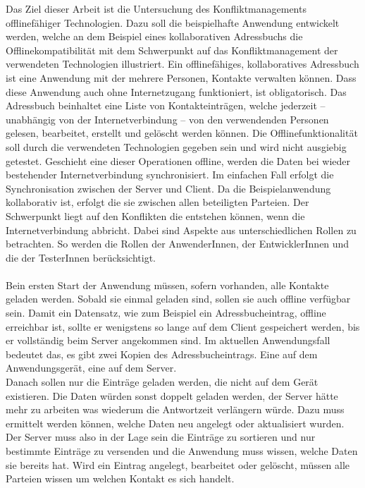 Das Ziel dieser Arbeit ist die Untersuchung des Konfliktmanagements offlinefähiger Technologien.
Dazu soll die beispielhafte Anwendung entwickelt werden, welche an dem Beispiel eines kollaborativen Adressbuchs die Offlinekompatibilität mit dem Schwerpunkt auf das Konfliktmanagement der verwendeten Technologien illustriert.
Ein offlinefähiges, kollaboratives Adressbuch ist eine Anwendung mit der mehrere Personen, Kontakte verwalten können.
Dass diese Anwendung auch ohne Internetzugang funktioniert, ist obligatorisch.
Das Adressbuch beinhaltet eine Liste von Kontakteinträgen, welche jederzeit -- unabhängig von der Internetverbindung -- von den verwendenden Personen gelesen, bearbeitet, erstellt und gelöscht werden können.
Die Offlinefunktionalität soll durch die verwendeten Technologien gegeben sein und wird nicht ausgiebig getestet.
Geschieht eine dieser Operationen offline, werden die Daten bei wieder bestehender Internetverbindung synchronisiert. Im einfachen Fall erfolgt die Synchronisation zwischen der Server und Client.
Da die Beispielanwendung kollaborativ ist, erfolgt die sie zwischen allen beteiligten Parteien.
Der Schwerpunkt liegt auf den Konflikten die entstehen können, wenn die Internetverbindung abbricht.
Dabei sind Aspekte aus unterschiedlichen Rollen zu betrachten. So werden die Rollen der AnwenderInnen, der EntwicklerInnen und die der TesterInnen berücksichtigt.\\\\
%
%
Bein ersten Start der Anwendung müssen, sofern vorhanden, alle Kontakte geladen werden. Sobald sie einmal geladen sind, sollen sie auch offline verfügbar sein.
Damit ein Datensatz, wie zum Beispiel ein Adressbucheintrag, offline erreichbar ist, sollte er wenigstens so lange auf dem Client gespeichert werden, bis er vollständig beim Server angekommen sind.
Im aktuellen Anwendungsfall bedeutet das, es gibt zwei Kopien des Adressbucheintrags. Eine auf dem Anwendungsgerät, eine auf dem Server.\\
Danach sollen nur die Einträge geladen werden, die nicht auf dem Gerät existieren. Die Daten würden sonst doppelt geladen werden, der Server hätte mehr zu arbeiten was wiederum die Antwortzeit verlängern würde.
Dazu muss ermittelt werden können, welche Daten neu angelegt oder aktualisiert wurden.
Der Server muss also in der Lage sein die Einträge zu sortieren und nur bestimmte Einträge zu versenden und die Anwendung muss wissen, welche Daten sie bereits hat. Wird ein Eintrag angelegt, bearbeitet oder gelöscht, müssen alle Parteien wissen um welchen Kontakt es sich handelt.
